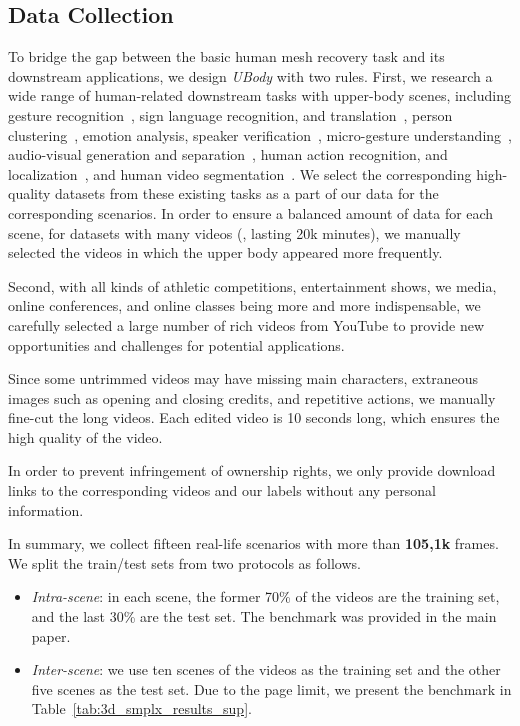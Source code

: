 \documentclass[10pt,twocolumn,letterpaper]{article}
\newcommand{\dataname}{\emph{UBody}\xspace}
\begin{document}
\subsection{Data Collection}
To bridge the gap between the basic human mesh recovery task and its downstream applications, we design \dataname with two rules. 
First, we research a wide range of human-related downstream tasks with upper-body scenes, including gesture recognition~\cite{yoonICRA19,guo2021human,mitra2007gesture}, sign language recognition, and translation~\cite{duarte2021how2sign,rastgoo2021sign,subburaj2022survey,Joze2019MSASLAL,camgoz2021content4all,zhou2021spatial}, person clustering~\cite{brown2021face}, emotion analysis, speaker verification~\cite{nagrani2020voxceleb}, micro-gesture understanding~\cite{liu2021imigue}, audio-visual generation and separation~\cite{pu2017audio}, human action recognition, and localization~\cite{pavlakos2022multishot,ChunhuiGu2017AVAAV,rockwell2020full,siarohin2021motion,fouhey2018lifestyle}, and human video segmentation~\cite{kuang2021flow}. We select the corresponding high-quality datasets from these existing tasks as a part of our data for the corresponding scenarios. In order to ensure a balanced amount of data for each scene, for datasets with many videos (\eg, lasting 20k minutes), we manually selected the videos in which the upper body appeared more frequently.

Second, with all kinds of athletic competitions, entertainment shows, we media, online conferences, and online classes being more and more indispensable, we carefully selected a large number of rich videos from YouTube to provide new opportunities and challenges for potential applications. 

Since some untrimmed videos may have missing main characters, extraneous images such as opening and closing credits, and repetitive actions, we manually fine-cut the long videos. Each edited video is 10 seconds long, which ensures the high quality of the video.

In order to prevent infringement of ownership rights, we only provide download links to the corresponding videos and our labels without any personal information.

In summary, we collect fifteen real-life scenarios with more than \textbf{105,1k} frames. 
We split the train/test sets from two protocols as follows. 
\begin{itemize}
\item
\emph{Intra-scene}: in each scene, the former 70\% of the videos are the training set, and the last 30\% are the test set. The benchmark was provided in the main paper.
\item
\emph{Inter-scene}: we use ten scenes of the videos as the training set and the other five scenes as the test set. Due to the page limit, we present the benchmark in Table~\ref{tab:3d_smplx_results_sup}.
\end{itemize}
\end{document}
